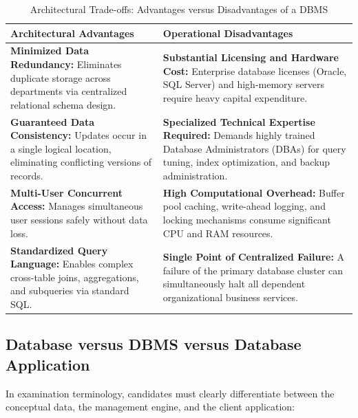 \begin{table}[htbp]
\centering
\caption{Architectural Trade-offs: Advantages versus Disadvantages of a DBMS}
\label{tab:dbms_pros_cons}
\begin{tabularx}{\textwidth}{p{7.5cm} X}
\toprule
\textbf{Architectural Advantages} & \textbf{Operational Disadvantages} \\
\midrule
\textbf{Minimized Data Redundancy:} Eliminates duplicate storage across departments via centralized relational schema design. & \textbf{Substantial Licensing and Hardware Cost:} Enterprise database licenses (Oracle, SQL Server) and high-memory servers require heavy capital expenditure. \\
\textbf{Guaranteed Data Consistency:} Updates occur in a single logical location, eliminating conflicting versions of records. & \textbf{Specialized Technical Expertise Required:} Demands highly trained Database Administrators (DBAs) for query tuning, index optimization, and backup administration. \\
\textbf{Multi-User Concurrent Access:} Manages simultaneous user sessions safely without data loss. & \textbf{High Computational Overhead:} Buffer pool caching, write-ahead logging, and locking mechanisms consume significant CPU and RAM resources. \\
\textbf{Standardized Query Language:} Enables complex cross-table joins, aggregations, and subqueries via standard SQL. & \textbf{Single Point of Centralized Failure:} A failure of the primary database cluster can simultaneously halt all dependent organizational business services. \\
\bottomrule
\end{tabularx}
\end{table}

\subsection{Database versus DBMS versus Database Application}

In examination terminology, candidates must clearly differentiate between the conceptual data, the management engine, and the client application:

